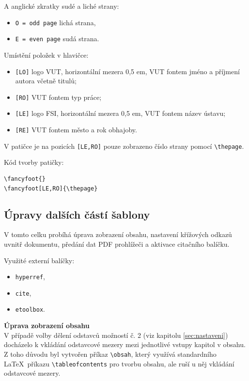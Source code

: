 A anglické zkratky sudé a liché strany:

\begin{itemize}[label=-]
	\item \verb|O = odd page| lichá strana,
	\item \verb|E = even page| sudá strana.
\end{itemize}

Umístění položek v hlavičce:

\begin{itemize}[label=-]
	\item \verb|[LO]| logo VUT, horizontální mezera 0,5 em, VUT fontem jméno a příjmení autora včetně titulů;
	\item \verb|[RO]| VUT fontem typ práce;
	\item \verb|[LE]| logo FSI, horizontální mezera 0,5 em, VUT fontem název ústavu;
	\item \verb|[RE]| VUT fontem město a rok obhajoby.
\end{itemize}

V patičce je na pozicích \verb|[LE,RO]| pouze zobrazeno číslo strany pomocí \verb|\thepage|.

Kód tvorby patičky:

\begin{verbatim}
\fancyfoot{}
\fancyfoot[LE,RO]{\thepage}
\end{verbatim}



\subsection{Úpravy dalších částí šablony}
\label{sec:dalsi_upravy}
V tomto celku probíhá úprava zobrazení obsahu, nastavení křížových odkazů uvnitř dokumentu, předání dat PDF prohlížeči a aktivace citačního balíčku.

Využité externí balíčky:

\begin{itemize}[label=-]
	\item \verb|hyperref|,
	\item \verb|cite|,
	\item \verb|etoolbox|.
\end{itemize}

\textbf{Úprava zobrazení obsahu}\\
V případě volby dělení odstavců možností č. 2 (viz kapitolu \ref{sec:nastaveni}) docházelo k vkládání odstavcové mezery mezi jednotlivé vstupy kapitol v obsahu. Z toho důvodu byl vytvořen příkaz \verb|\obsah|, který využívá standardního \LaTeX\ příkazu \verb|\tableofcontents| pro tvorbu obsahu, ale ruší u něj vkládání odstavcové mezery.

